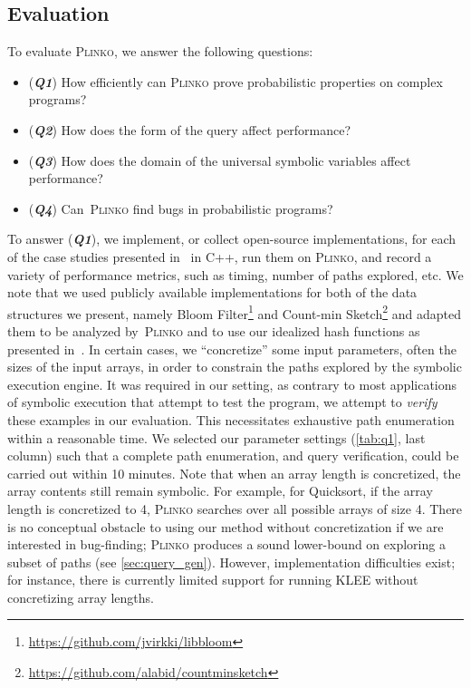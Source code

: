 \documentclass[acmsmall,review,anonymous]{acmart}\settopmatter{printfolios=true,printccs=false,printacmref=false}
\newcommand{\SYSTEM}{\textsc{Plinko}\xspace}
\newcommand{\Q}[1]{(\textit{\textbf{Q#1}})}
\begin{document}
\subsection{Evaluation}
\label{sec:eval}

To evaluate \SYSTEM, we answer the following questions:
%
\begin{itemize}
  \item \Q{1} How efficiently can \SYSTEM prove probabilistic properties on complex programs?
  \item \Q{2} How does the form of the query affect performance?
  \item \Q{3} How does the domain of the universal symbolic variables affect performance?
  \item \Q{4} Can~\SYSTEM find bugs in probabilistic programs?
\end{itemize}
%
To answer \Q{1}, we implement, or collect open-source implementations, for each of the case studies presented in~ in C++, run them on \SYSTEM, and record a variety of performance metrics, such as timing, number of paths explored, etc.
% 
We note that we used publicly available implementations for both of the data structures we present, namely Bloom Filter\footnote{\url{https://github.com/jvirkki/libbloom}} and Count-min Sketch\footnote{\url{https://github.com/alabid/countminsketch}} and adapted them to be analyzed by~\SYSTEM and to use our idealized hash functions as presented in~.
% 
In certain cases, we ``concretize'' some input parameters, often the sizes of the input arrays, in order to constrain the paths explored by the symbolic execution engine.
% 
It was required in our setting, as contrary to most applications of symbolic execution that attempt to test the program, we attempt to \textit{verify} these examples in our evaluation.
% 
This necessitates exhaustive path enumeration within a reasonable time.
%
We selected our parameter settings (\cref{tab:q1}, last column) such that a complete path enumeration, and query verification, could be carried out within 10 minutes.
%
Note that when an array length is concretized, the array contents still remain symbolic. For example, for Quicksort, if the array length is concretized to 4, {\SYSTEM} searches over all possible arrays of size 4.
%
There is no conceptual obstacle to using our method without concretization if we are interested in bug-finding; {\SYSTEM} produces a sound lower-bound on exploring a subset of paths (see \cref{sec:query_gen}). However, implementation difficulties exist; for instance, there is currently limited support for running KLEE without concretizing array lengths.
\end{document}

